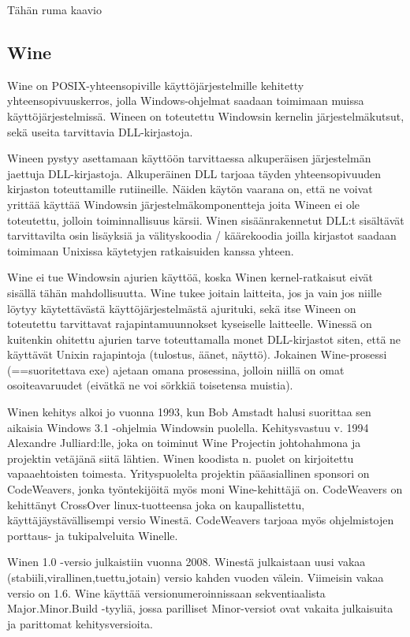 Tähän ruma kaavio

\subsection{Wine}
Wine on POSIX-yhteensopiville käyttöjärjestelmille kehitetty yhteensopivuuskerros, jolla Windows-ohjelmat saadaan toimimaan muissa käyttöjärjestelmissä. Wineen on toteutettu Windowsin kernelin järjestelmäkutsut, sekä useita tarvittavia DLL-kirjastoja. 

Wineen pystyy asettamaan käyttöön tarvittaessa alkuperäisen järjestelmän jaettuja DLL-kirjastoja. Alkuperäinen DLL tarjoaa täyden yhteensopivuuden kirjaston toteuttamille rutiineille. Näiden käytön vaarana on, että ne voivat yrittää käyttää Windowsin järjestelmäkomponentteja joita Wineen ei ole toteutettu, jolloin toiminnallisuus kärsii. Winen sisäänrakennetut DLL:t sisältävät tarvittavilta osin lisäyksiä ja välityskoodia / käärekoodia joilla kirjastot saadaan toimimaan Unixissa käytetyjen ratkaisuiden kanssa yhteen. 

Wine ei tue Windowsin ajurien käyttöä, koska Winen kernel-ratkaisut eivät sisällä tähän mahdollisuutta. Wine tukee joitain laitteita, jos ja vain jos niille löytyy käytettävästä käyttöjärjestelmästä ajurituki, sekä itse Wineen on toteutettu tarvittavat rajapintamuunnokset kyseiselle laitteelle. Winessä on kuitenkin ohitettu ajurien tarve toteuttamalla monet DLL-kirjastot siten, että ne käyttävät Unixin rajapintoja (tulostus, äänet, näyttö). Jokainen Wine-prosessi (==suoritettava exe) ajetaan omana prosessina, jolloin niillä on omat osoiteavaruudet (eivätkä ne voi sörkkiä toisetensa muistia).

Winen kehitys alkoi jo vuonna 1993, kun Bob Amstadt halusi suorittaa sen aikaisia Windows 3.1 -ohjelmia Windowsin puolella. Kehitysvastuu v. 1994 Alexandre Julliard:lle, joka on toiminut Wine Projectin johtohahmona ja projektin vetäjänä siitä lähtien. Winen koodista n. puolet on kirjoitettu vapaaehtoisten toimesta. Yrityspuolelta projektin pääasiallinen sponsori on CodeWeavers, jonka työntekijöitä myös moni Wine-kehittäjä on. CodeWeavers on kehittänyt CrossOver linux-tuotteensa joka on kaupallistettu, käyttäjäystävällisempi versio Winestä. CodeWeavers tarjoaa myös ohjelmistojen porttaus- ja tukipalveluita Winelle.

Winen 1.0 -versio julkaistiin vuonna 2008. Winestä julkaistaan uusi vakaa (stabiili,virallinen,tuettu,jotain) versio kahden vuoden välein. Viimeisin vakaa versio on 1.6. Wine käyttää versionumeroinnissaan sekventiaalista Major.Minor.Build -tyyliä, jossa parilliset Minor-versiot ovat vakaita julkaisuita ja parittomat kehitysversioita. 

